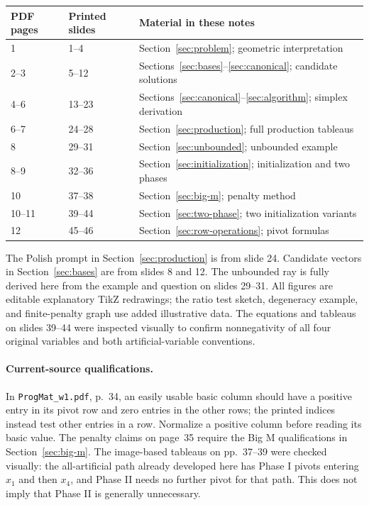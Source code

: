 \documentclass[11pt,a4paper]{article}
\begin{document}
\begin{center}
  \begin{tabular}{lll}\toprule
    PDF pages & Printed slides & Material in these notes\\\midrule
    1 & 1--4 & Section~\ref{sec:problem}; geometric interpretation\\
    2--3 & 5--12 & Sections~\ref{sec:bases}--\ref{sec:canonical}; candidate solutions\\
    4--6 & 13--23 & Sections~\ref{sec:canonical}--\ref{sec:algorithm}; simplex derivation\\
    6--7 & 24--28 & Section~\ref{sec:production}; full production tableaus\\
    8 & 29--31 & Section~\ref{sec:unbounded}; unbounded example\\
    8--9 & 32--36 & Section~\ref{sec:initialization}; initialization and two phases\\
    10 & 37--38 & Section~\ref{sec:big-m}; penalty method\\
    10--11 & 39--44 & Section~\ref{sec:two-phase}; two initialization variants\\
    12 & 45--46 & Section~\ref{sec:row-operations}; pivot formulas\\\bottomrule
  \end{tabular}
\end{center}
The Polish prompt in Section~\ref{sec:production} is from slide 24.
Candidate vectors in Section~\ref{sec:bases} are from slides 8 and 12.
The unbounded ray is fully derived here from the example and question on
slides 29--31. All figures are editable explanatory TikZ redrawings; the ratio
test sketch, degeneracy example, and finite-penalty graph use added illustrative
data. The equations and tableaus on slides 39--44 were inspected visually to
confirm nonnegativity of all four original variables and both artificial-variable
conventions.

\paragraph{Current-source qualifications.}
In \texttt{ProgMat\_w1.pdf}, p.~34, an easily usable basic column should
have a positive entry in its pivot row and zero entries in the other rows;
the printed indices instead test other entries in a row. Normalize a positive
column before reading its basic value. The penalty claims on page~35
require the Big M qualifications in Section~\ref{sec:big-m}. The image-based
tableaus on pp.~37--39 were checked visually: the all-artificial path already
developed here has Phase I pivots entering $x_1$ and then $x_4$, and Phase II
needs no further pivot for that path. This does not imply that Phase II is
generally unnecessary.
\end{document}
